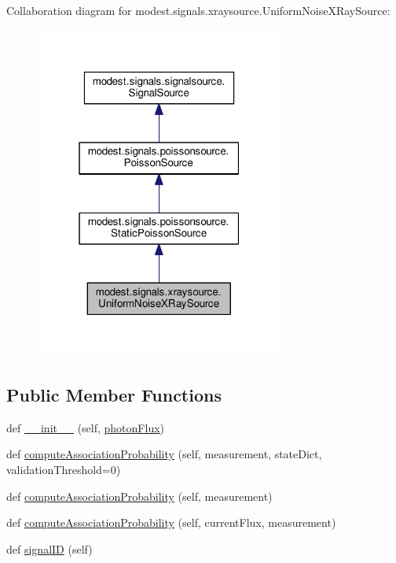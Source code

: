 Collaboration diagram for modest.\+signals.\+xraysource.\+Uniform\+Noise\+X\+Ray\+Source\+:
\nopagebreak
\begin{figure}[H]
\begin{center}
\leavevmode
\includegraphics[width=232pt]{classmodest_1_1signals_1_1xraysource_1_1UniformNoiseXRaySource__coll__graph}
\end{center}
\end{figure}
\subsection*{Public Member Functions}
\begin{DoxyCompactItemize}
\item 
def \hyperlink{classmodest_1_1signals_1_1xraysource_1_1UniformNoiseXRaySource_a2bf2964e92d4540de35c6eebfe4944db}{\+\_\+\+\_\+init\+\_\+\+\_\+} (self, \hyperlink{classmodest_1_1signals_1_1xraysource_1_1UniformNoiseXRaySource_a9b8049972baf6e0640181b58850a3d20}{photon\+Flux})
\item 
def \hyperlink{classmodest_1_1signals_1_1xraysource_1_1UniformNoiseXRaySource_aa4732c82202fd8c607ae0f8244be3272}{compute\+Association\+Probability} (self, measurement, state\+Dict, validation\+Threshold=0)
\item 
def \hyperlink{classmodest_1_1signals_1_1poissonsource_1_1StaticPoissonSource_a1754d94bff46d97817438bab552afef9}{compute\+Association\+Probability} (self, measurement)
\item 
def \hyperlink{classmodest_1_1signals_1_1poissonsource_1_1PoissonSource_a2f8a73e6f51cbdcd0f1e646d6f4d4574}{compute\+Association\+Probability} (self, current\+Flux, measurement)
\item 
def \hyperlink{classmodest_1_1signals_1_1signalsource_1_1SignalSource_a9a64c6a9c2954f6ad61e4ca3518ea8ab}{signal\+ID} (self)
\end{DoxyCompactItemize}
